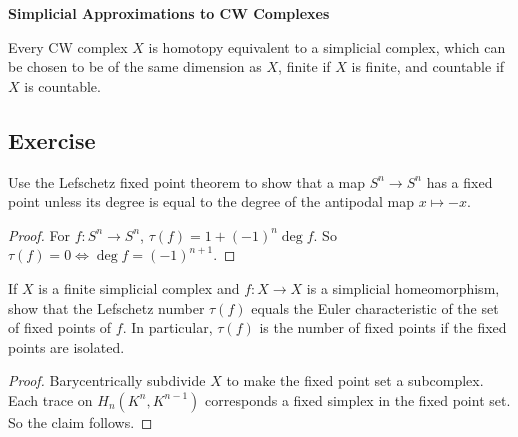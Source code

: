 \textbf{Simplicial Approximations to CW Complexes}
\begin{theorem}
Every CW complex $X$ is homotopy equivalent to a simplicial complex, which can be chosen to be of the same dimension as $X$, finite if $X$ is finite, and
countable if $X$ is countable.
\end{theorem}
\subsection{Exercise}
\begin{exercise}
Use the Lefschetz fixed point theorem to show that a map $S^n\to S^n$ has a fixed point unless its degree is equal to the degree of the antipodal map $x\mapsto-x$.
\end{exercise}
\begin{proof}
For $f:S^n\to S^n$, $\tau(f)=1+(-1)^n\deg f$. So $\tau(f)=0\iff\deg f=(-1)^{n+1}$.
\end{proof}
\begin{exercise}
If $X$ is a finite simplicial complex and $f:X\to X$ is a simplicial homeomorphism, show that the Lefschetz number $\tau(f)$ equals the Euler characteristic of the set of fixed points of $f$. In particular, $\tau(f)$ is the number of fixed points if the fixed points are isolated.
\end{exercise}
\begin{proof}
Barycentrically subdivide $X$ to make the fixed point set a subcomplex. Each trace on $H_n(K^n,K^{n-1})$ corresponds a fixed simplex in the fixed point set. So the claim follows.
\end{proof}